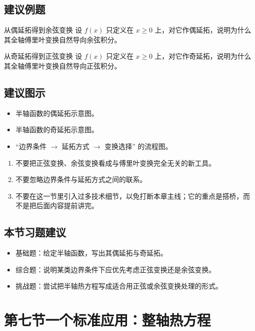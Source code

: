 \subsection*{建议例题}
\begin{lizi}{从偶延拓得到余弦变换}{}
设 $f(x)$ 只定义在 $x\ge 0$ 上，对它作偶延拓，说明为什么其全轴傅里叶变换自然导向余弦积分。
\end{lizi}

\begin{lizi}{从奇延拓得到正弦变换}{}
设 $f(x)$ 只定义在 $x\ge 0$ 上，对它作奇延拓，说明为什么其全轴傅里叶变换自然导向正弦积分。
\end{lizi}

\subsection*{建议图示}
\begin{itemize}
    \item 半轴函数的偶延拓示意图。
    \item 半轴函数的奇延拓示意图。
    \item ``边界条件 $\to$ 延拓方式 $\to$ 变换选择'' 的流程图。
\end{itemize}

\begin{jinshi}[本节易错点]
\begin{enumerate}
    \item 不要把正弦变换、余弦变换看成与傅里叶变换完全无关的新工具。
    \item 不要忽略边界条件与延拓方式之间的联系。
    \item 不要在这一节里引入过多技术细节，以免打断本章主线；它的重点是搭桥，而不是把后面内容提前讲完。
\end{enumerate}
\end{jinshi}

\subsection*{本节习题建议}
\begin{itemize}
    \item 基础题：给定半轴函数，写出其偶延拓与奇延拓。
    \item 综合题：说明某类边界条件下应优先考虑正弦变换还是余弦变换。
    \item 挑战题：尝试把半轴热方程写成适合用正弦或余弦变换处理的形式。
\end{itemize}

\section{第七节\quad 一个标准应用：整轴热方程}

